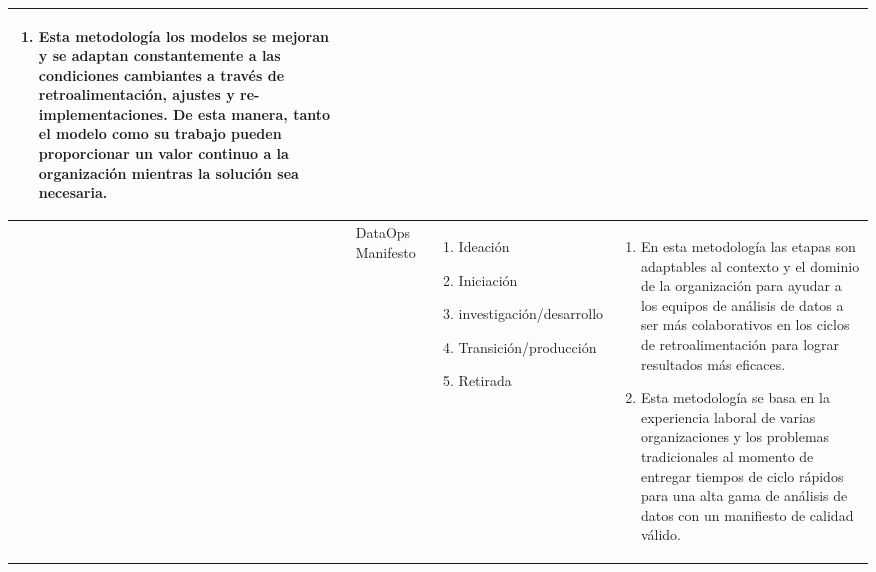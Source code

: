\begin{table*}[!htb]
\begin{threeparttable}
\begin{tabular}{p{1cm} p{2cm} p{5cm} p{6.5cm}}
\begin{enumerate}
				\item Esta metodología los modelos se mejoran y se adaptan constantemente a las condiciones cambiantes a través de retroalimentación, ajustes y re-implementaciones. De esta manera, tanto el modelo como su trabajo pueden proporcionar un valor continuo a la organización mientras la solución sea necesaria.
			\end{enumerate}
			\\ \hline
			\cite{Dastgerdi2021}
			& DataOps Manifesto
			&  \begin{enumerate}
				\item Ideación
				\item Iniciación
				\item investigación/desarrollo
				\item Transición/producción
				\item Retirada
			\end{enumerate}
			& \begin{enumerate}
				\item En esta metodología las etapas son adaptables al contexto y el dominio de la organización para ayudar a los equipos de análisis de datos a ser más colaborativos en los ciclos de retroalimentación para lograr resultados más eficaces. 
				\item Esta metodología se basa en la experiencia laboral de varias organizaciones y los problemas tradicionales al momento de entregar tiempos de ciclo rápidos para una alta gama de análisis de datos con un manifiesto de calidad válido.
			\end{enumerate}
			\\ \hline
		\end{tabular}
	\end{threeparttable}
\end{table*}

